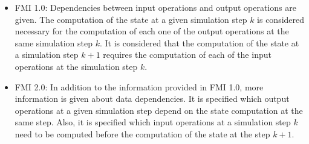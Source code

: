 \begin{itemize}
\item FMI 1.0: Dependencies between input operations and output operations are given. The computation of the state at a given simulation step $k$ is considered necessary for the computation of each one of the output operations at the same simulation step $k$. It is considered that the computation of the state at a simulation step $k+1$ requires the computation of each of the input operations at the simulation step $k$.
\item FMI 2.0: In addition to the information provided in FMI 1.0, more information is given about data dependencies. It is specified which output operations at a given simulation step depend on the state computation at the same step. Also, it is specified which input operations at a simulation step $k$ need to be computed before the computation of the state at the step $k+1$.  
\end{itemize}

